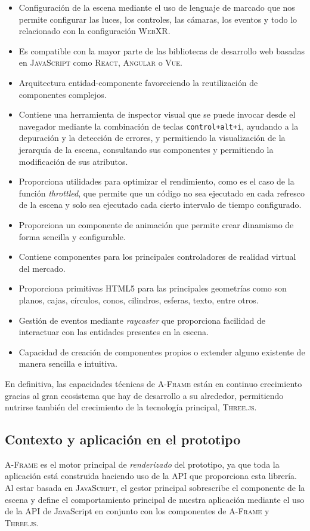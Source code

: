 \documentclass[a4paper, 11pt]{book}
\begin{document}
\begin{itemize}
	\item Configuración de la escena mediante el uso de lenguaje de marcado que nos permite configurar las luces, los controles, las cámaras, los eventos y todo lo relacionado con la configuración \textsc{WebXR}.
	\item Es compatible con la mayor parte de las bibliotecas de desarrollo web basadas en \textsc{JavaScript} como \textsc{React}, \textsc{Angular} o \textsc{Vue}.
	\item Arquitectura entidad-componente favoreciendo la reutilización de componentes complejos.
	\item Contiene una herramienta de inspector visual que se puede invocar desde el navegador mediante la combinación de teclas \texttt{control+alt+i}, ayudando a la depuración y la detección de errores, y permitiendo la visualización de la jerarquía de la escena, consultando sus componentes y permitiendo la modificación de sus atributos.
	\item Proporciona utilidades para optimizar el rendimiento, como es el caso de la función \emph{throttled}, que permite que un código no sea ejecutado en cada refresco de la escena y solo sea ejecutado cada cierto intervalo de tiempo configurado.
	\item Proporciona un componente de animación que permite crear dinamismo de forma sencilla y configurable.
	\item Contiene componentes para los principales controladores de realidad virtual del mercado.
	\item Proporciona primitivas \textsc{HTML5} para las principales geometrías como son planos, cajas, círculos, conos, cilindros, esferas, texto, entre otros.
	\item Gestión de eventos mediante \emph{\gls{raycaster}} que proporciona facilidad de interactuar con las entidades presentes en la escena.
	\item Capacidad de creación de componentes propios o extender alguno existente de manera sencilla e intuitiva.
\end{itemize}

En definitiva, las capacidades técnicas de \textsc{A-Frame} están en continuo crecimiento gracias al gran ecosistema que hay de desarrollo a su alrededor, permitiendo nutrirse también del crecimiento de la tecnología principal, \textsc{Three.js}.
\subsection{Contexto y aplicación en el prototipo}
\textsc{A-Frame} es el motor principal de \emph{renderizado} del prototipo, ya que toda la aplicación está construida haciendo uso de la \textsc{\gls{API}} que proporciona esta librería. Al estar basada en \textsc{JavaScript}, el gestor principal sobrescribe el componente de la escena y define el comportamiento principal de nuestra aplicación mediante el uso de la \textsc{API} de JavaScript en conjunto con los componentes de \textsc{A-Frame} y \textsc{Three.js}.
\end{document}
